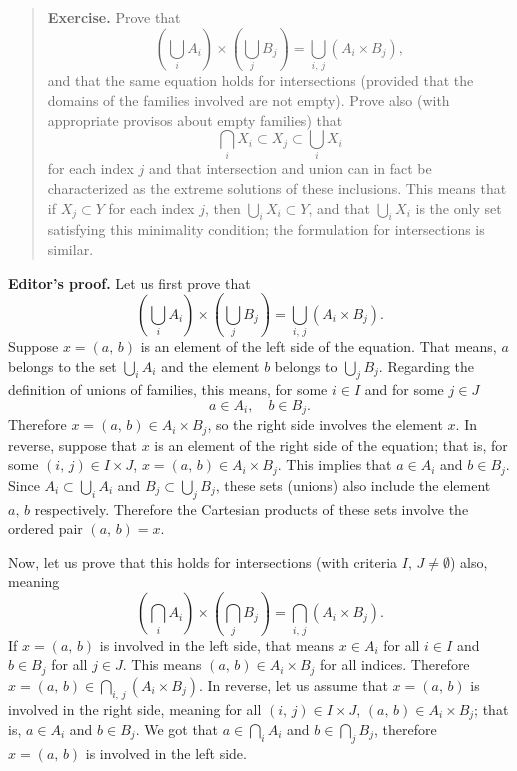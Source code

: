 \begin{quote}
	\textbf{Exercise.} Prove that
	\[
		\left( \bigcup_i A_i \right) \times \left( \bigcup_j B_j\right) = \bigcup_{i, \,j} (A_i \times B_j),
	\]
	and that the same equation holds for intersections (provided that the domains of the families involved are not empty). Prove also (with appropriate provisos about empty families) that 
	\[
		\bigcap_i X_i \subset X_j \subset \bigcup_i X_i
	\]
	for each index $j$ and that intersection and union can in fact be characterized as the extreme solutions of these inclusions. This means that if $X_j \subset Y$ for each index $j$, then $\bigcup_i X_i \subset Y$, and that $\bigcup_i X_i$ is the only set satisfying this minimality condition; the formulation for intersections is similar.
\end{quote}

\textbf{Editor's proof.} Let us first prove that
\[
 \left( \bigcup_i A_i \right) \times \left( \bigcup_j B_j\right) = \bigcup_{i, \,j} (A_i \times B_j).
\]
Suppose $x = (a, \, b)$ is an element of the left side of the equation. That means, $a$ belongs to the set $\bigcup_i A_i$ and the element $b$ belongs to $\bigcup_j B_j$. Regarding the definition of unions of families, this means, for some $i \in I$ and for some $j \in J$
\[
	a \in A_i, \quad b \in B_j.
\]
Therefore $x = (a, \, b) \in A_i \times B_j$, so the right side involves the element $x$. In reverse, suppose that $x$ is an element of the right side of the equation; that is, for some $(i, \, j) \in I \times J$, $x = (a, \, b) \in A_i \times B_j$. This implies that $a \in A_i$ and $b \in B_j$. Since $A_i \subset \bigcup_i A_i$ and $B_j \subset \bigcup_j B_j$, these sets (unions) also include the element $a, \, b$ respectively. Therefore the Cartesian products of these sets involve the ordered pair $(a, \, b) = x$.

Now, let us prove that this holds for intersections (with criteria $I, \, J \neq \emptyset$) also, meaning
\[
\left( \bigcap_i A_i \right) \times \left( \bigcap_j B_j\right) = \bigcap_{i, \,j} (A_i \times B_j).
\]
If $x = (a, \, b)$ is involved in the left side, that means $x \in A_i$ for all $i \in I$ and $b \in B_j$ for all $j \in J$. This means $(a, \, b) \in A_i \times B_j$ for all indices. Therefore $x = (a, \, b) \in \bigcap_{i, \, j} (A_i \times B_j)$. In reverse, let us assume that $x = (a, \, b)$ is involved in the right side, meaning for all $(i, \, j) \in I \times J$, $(a, \, b) \in A_i \times B_j$; that is, $a \in A_i$ and $b \in B_j$. We got that $a \in \bigcap_i A_i$ and $b \in \bigcap_j B_j$, therefore $x = (a, \, b)$ is involved in the left side.

